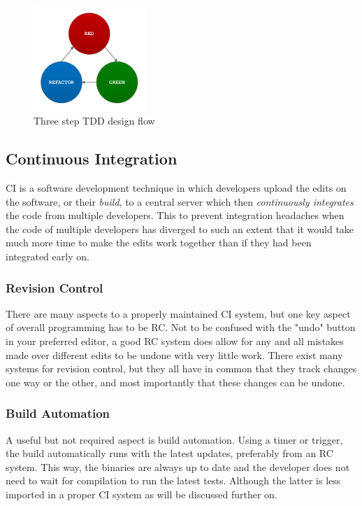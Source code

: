 \documentclass[11pt,british]{article}
\begin{document}
\begin{figure}[h]
    \centering
	\includegraphics[width=0.38\textwidth]{images/tdd.pdf}
    \caption{Three step TDD design flow}
    \label{fig:TDD_Flow}
\end{figure}

\subsection{Continuous Integration}
\gls{CI} is a software development technique in which developers upload the edits on the software, or their \emph{build}, to a central server which then \emph{continuously integrates} the code from multiple developers. This to prevent integration headaches when the code of multiple developers has diverged to such an extent that it would take much more time to make the edits work together than if they had been integrated early on.

\subsubsection{Revision Control}
There are many aspects to a properly maintained \gls{CI} system, but one key aspect of overall programming has to be \gls{RC}. Not to be confused with the "undo" button in your preferred editor, a good \gls{RC} system does allow for any and all mistakes made over different edits to be undone with very little work. There exist many systems for revision control, but they all have in common that they track changes one way or the other, and most importantly that these changes can be undone. 

\subsubsection{Build Automation}
A useful but not required aspect is build automation. Using a timer or trigger, the build automatically runs with the latest updates, preferably from an \gls{RC} system. This way, the binaries are always up to date and the developer does not need to wait for compilation to run the latest tests. Although the latter is less imported in a proper \gls{CI} system as will be discussed further on. 
\end{document}
